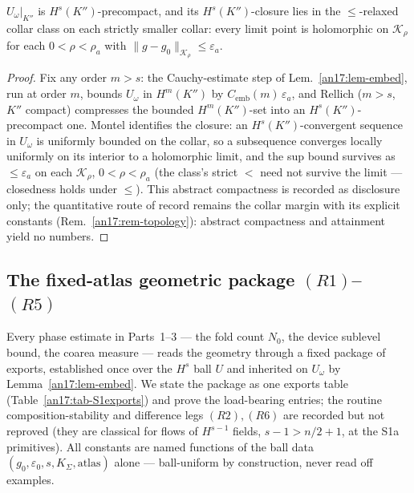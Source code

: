 \begin{lemma}\label{an17:lem-precompact}
$U_\omega|_{K''}$ is $H^s(K'')$-precompact, and its $H^s(K'')$-closure lies in
the $\le$-relaxed collar class on each strictly smaller collar: every limit
point is holomorphic on $\mathcal K_{\rho}$ for each $0<\rho<\rho_a$ with
$\|g-g_0\|_{\mathcal K_{\rho}}\le\varepsilon_a$.
\end{lemma}
\begin{proof}
Fix any order $m>s$: the Cauchy-estimate step of Lem.~\ref{an17:lem-embed}, run
at order $m$, bounds $U_\omega$ in $H^m(K'')$ by $C_{\mathrm{emb}}(m)\,
\varepsilon_a$, and Rellich ($m>s$, $K''$ compact) compresses the bounded
$H^m(K'')$-set into an $H^s(K'')$-precompact one. Montel identifies the closure:
an $H^s(K'')$-convergent sequence in $U_\omega$ is uniformly bounded on the
collar, so a subsequence converges locally uniformly on its interior to a
holomorphic limit, and the sup bound survives as $\le\varepsilon_a$ on each
$\mathcal K_{\rho}$, $0<\rho<\rho_a$ (the class's strict $<$ need not survive
the limit --- closedness holds under $\le$). This abstract compactness is
recorded as disclosure only; the quantitative route of record remains the
collar margin with its explicit constants (Rem.~\ref{an17:rem-topology}):
abstract compactness and attainment yield no numbers.
\end{proof}

\subsection{The fixed-atlas geometric package
\texorpdfstring{$(R1)$--$(R5)$}{(R1)-(R5)}}
\label{an17:sub-S1}

Every phase estimate in Parts~1--3 --- the fold count $N_0$, the device sublevel
bound, the coarea measure --- reads the geometry through a fixed package of
exports, established once over the $H^s$ ball $U$ and inherited on $U_\omega$ by
Lemma~\ref{an17:lem-embed}. We state the package as one exports table
(Table~\ref{an17:tab-S1exports}) and prove the load-bearing entries; the
routine composition-stability and difference legs $(R2),(R6)$ are recorded but
not reproved (they are classical for flows of $H^{s-1}$ fields, $s-1>n/2+1$, at
the S1a primitives). All constants are named functions of the ball data
$(g_0,\varepsilon_0,s,K_\Sigma,\text{atlas})$ alone --- ball-uniform by
construction, never read off examples.

